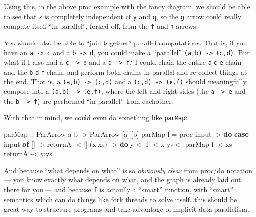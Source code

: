 \documentclass[]{article}
\newenvironment{Shaded}{}{}
\newcommand{\KeywordTok}[1]{\textcolor[rgb]{0.00,0.44,0.13}{\textbf{{#1}}}}
\newcommand{\DataTypeTok}[1]{\textcolor[rgb]{0.56,0.13,0.00}{{#1}}}
\newcommand{\OtherTok}[1]{\textcolor[rgb]{0.00,0.44,0.13}{{#1}}}
\newcommand{\FunctionTok}[1]{\textcolor[rgb]{0.02,0.16,0.49}{{#1}}}
\newcommand{\NormalTok}[1]{{#1}}
\begin{document}
Using this, in the above proc example with the fancy diagram, we should
be able to see that \texttt{z} is completely independent of \texttt{y}
and \texttt{q}, so the \texttt{g} arrow could really compute itself ``in
parallel'', forked-off, from the \texttt{f} and \texttt{h} arrows.

You should also be able to ``join together'' parallel computations. That
is, if you have an \texttt{a\ -\textgreater{}\ c} and a
\texttt{b\ -\textgreater{}\ d}, you could make a ``parallel''
\texttt{(a,b)\ -\textgreater{}\ (c,d)}. But what if I also had a
\texttt{c\ -\textgreater{}\ e} and a \texttt{d\ -\textgreater{}\ f}? I
could chain the entire \texttt{a}-\texttt{c}-\texttt{e} chain and the
\texttt{b}-\texttt{d}-\texttt{f} chain, and perform both chains in
parallel and re-collect things at the end. That is, a
\texttt{(a,b)\ -\textgreater{}\ (c,d)} and a
\texttt{(c,d)\ -\textgreater{}\ (e,f)} should meaningfully compose into
a \texttt{(a,b)\ -\textgreater{}\ (e,f)}, where the left and right sides
(the \texttt{a\ -\textgreater{}\ e} and the
\texttt{b\ -\textgreater{}\ f}) are performed ``in parallel'' from
eachother.

With that in mind, we could even do something like \texttt{parMap}:

\begin{Shaded}
\begin{Highlighting}[]
\OtherTok{parMap ::} \DataTypeTok{ParArrow} \NormalTok{a b }\OtherTok{->} \DataTypeTok{ParArrow} \NormalTok{[a] [b]}
\NormalTok{parMap f }\FunctionTok{=} \NormalTok{proc input }\OtherTok{->} \KeywordTok{do}
    \KeywordTok{case} \NormalTok{input }\KeywordTok{of}
      \NormalTok{[]     }\OtherTok{->}
          \NormalTok{returnA        }\FunctionTok{-<} \NormalTok{[]}
      \NormalTok{(x}\FunctionTok{:}\NormalTok{xs) }\OtherTok{->} \KeywordTok{do}
          \NormalTok{y  }\OtherTok{<-} \NormalTok{f        }\FunctionTok{-<} \NormalTok{x}
          \NormalTok{ys }\OtherTok{<-} \NormalTok{parMap f }\FunctionTok{-<} \NormalTok{xs}
          \NormalTok{returnA        }\FunctionTok{-<} \NormalTok{y}\FunctionTok{:}\NormalTok{ys}
\end{Highlighting}
\end{Shaded}

And because ``what depends on what'' is so \emph{obviously clear} from
proc/do notation --- you know exactly what depends on what, and the
graph is already laid out there for you --- and because \texttt{f} is
actaully a ``smart'' function, with ``smart'' semantics which can do
things like fork threads to solve itself\ldots{}this should be great way
to structure programs and take advantage of implicit data parallelism.
\end{document}
